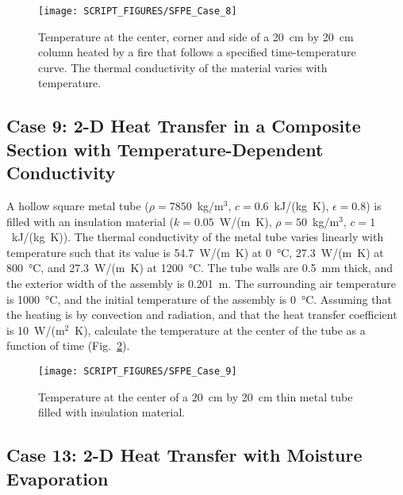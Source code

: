 \documentclass[11pt]{book}
\begin{document}
\begin{figure}[ht]
\centering
\texttt{[image: SCRIPT\_FIGURES/SFPE\_Case\_8]}
\caption[The SFPE heat transfer verification Case 8]{Temperature at the center, corner and side of a 20~cm by 20~cm column heated by a fire that follows a specified time-temperature curve. The thermal conductivity of the material varies with temperature.}
\label{fig:SFPE_Case_8}
\end{figure}

\FloatBarrier


\subsection{Case 9: 2-D Heat Transfer in a Composite Section with Temperature-Dependent Conductivity}
\label{SFPE_Case_9}

A hollow square metal tube ($\rho=7850$~kg/m$^3$, $c=0.6$~kJ/(kg~K), $\epsilon=0.8$) is filled with an insulation material ($k=0.05$~W/(m~K), $\rho=50$~kg/m$^3$, $c=1$~kJ/(kg~K)). The thermal conductivity of the metal tube varies linearly with temperature such that its value is 54.7~W/(m~K) at 0~°C, 27.3~W/(m~K) at 800~°C, and 27.3~W/(m~K) at 1200~°C. The tube walls are 0.5~mm thick, and the exterior width of the assembly is 0.201~m. The surrounding air temperature is 1000~°C, and the initial temperature of the assembly is 0~°C. Assuming that the heating is by convection and radiation, and that the heat transfer coefficient is 10~W/(m$^2$~K), calculate the temperature at the center of the tube as a function of time (Fig.~\ref{fig:SFPE_Case_9}).

\begin{figure}[ht]
\centering
\texttt{[image: SCRIPT\_FIGURES/SFPE\_Case\_9]}
\caption[The SFPE heat transfer verification Case 9]{Temperature at the center of a 20~cm by 20~cm thin metal tube filled with insulation material.}
\label{fig:SFPE_Case_9}
\end{figure}

\FloatBarrier

\subsection{Case 13: 2-D Heat Transfer with Moisture Evaporation}
\label{SFPE_Case_13}
\end{document}
